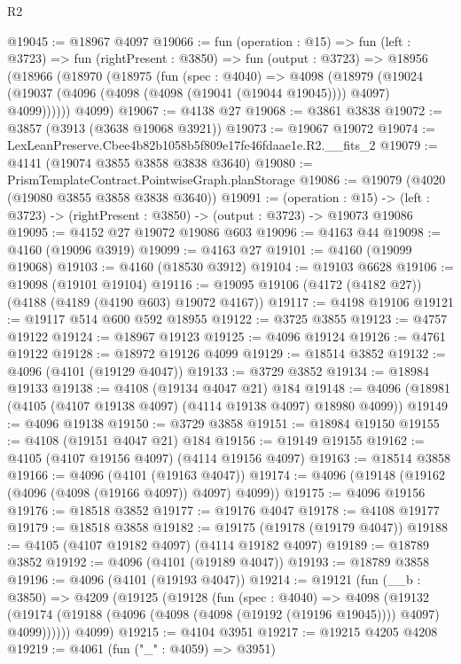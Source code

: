 \begin{lexlean}{R2}
\begin{coremodule}
@19045 := @18967 @4097
@19066 := fun (operation : @15) =>
  fun (left : @3723) =>
  fun (rightPresent : @3850) =>
  fun (output : @3723) =>
  @18956
    (@18966
      (@18970
        (@18975
          (fun (spec : @4040) =>
          @4098
            (@18979
              (@19024 (@19037 (@4096 (@4098 (@4098 (@19041 (@19044 @19045)))) @4097) @4099))))))
      @4099)
@19067 := @4138 @27
@19068 := @3861 @3838
@19072 := @3857 (@3913 (@3638 @19068 @3921))
@19073 := @19067 @19072
@19074 := LexLeanPreserve.Cbee4b82b1058b5f809e17fe46fdaae1e.R2.__fits_2
@19079 := @4141 (@19074 @3855 @3858 @3838 @3640)
@19080 := PrismTemplateContract.PointwiseGraph.planStorage
@19086 := @19079 (@4020 (@19080 @3855 @3858 @3838 @3640))
@19091 := (operation : @15) ->
  (left : @3723) -> (rightPresent : @3850) -> (output : @3723) -> @19073 @19086
@19095 := @4152 @27 @19072 @19086 @603
@19096 := @4163 @44
@19098 := @4160 (@19096 @3919)
@19099 := @4163 @27
@19101 := @4160 (@19099 @19068)
@19103 := @4160 (@18530 @3912)
@19104 := @19103 @6628
@19106 := @19098 (@19101 @19104)
@19116 := @19095 @19106 (@4172 (@4182 @27)) (@4188 (@4189 (@4190 @603) @19072 @4167))
@19117 := @4198 @19106
@19121 := @19117 @514 @600 @592 @18955
@19122 := @3725 @3855
@19123 := @4757 @19122
@19124 := @18967 @19123
@19125 := @4096 @19124
@19126 := @4761 @19122
@19128 := @18972 @19126 @4099
@19129 := @18514 @3852
@19132 := @4096 (@4101 (@19129 @4047))
@19133 := @3729 @3852
@19134 := @18984 @19133
@19138 := @4108 (@19134 @4047 @21) @184
@19148 := @4096 (@18981 (@4105 (@4107 @19138 @4097) (@4114 @19138 @4097) @18980 @4099))
@19149 := @4096 @19138
@19150 := @3729 @3858
@19151 := @18984 @19150
@19155 := @4108 (@19151 @4047 @21) @184
@19156 := @19149 @19155
@19162 := @4105 (@4107 @19156 @4097) (@4114 @19156 @4097)
@19163 := @18514 @3858
@19166 := @4096 (@4101 (@19163 @4047))
@19174 := @4096 (@19148 (@19162 (@4096 (@4098 (@19166 @4097)) @4097) @4099))
@19175 := @4096 @19156
@19176 := @18518 @3852
@19177 := @19176 @4047
@19178 := @4108 @19177
@19179 := @18518 @3858
@19182 := @19175 (@19178 (@19179 @4047))
@19188 := @4105 (@4107 @19182 @4097) (@4114 @19182 @4097)
@19189 := @18789 @3852
@19192 := @4096 (@4101 (@19189 @4047))
@19193 := @18789 @3858
@19196 := @4096 (@4101 (@19193 @4047))
@19214 := @19121
    (fun (__b : @3850) =>
    @4209
      (@19125
        (@19128
          (fun (spec : @4040) =>
          @4098
            (@19132
              (@19174 (@19188 (@4096 (@4098 (@4098 (@19192 (@19196 @19045)))) @4097) @4099))))))
      @4099)
@19215 := @4104 @3951
@19217 := @19215 @4205 @4208
@19219 := @4061 (fun ("_" : @4059) => @3951)

\end{coremodule}
\end{lexlean}
